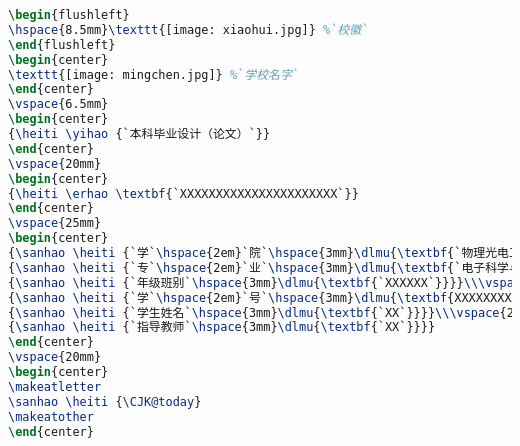 \begin{lstlisting}[language=TeX]
\begin{flushleft}
\hspace{8.5mm}\texttt{[image: xiaohui.jpg]} %`校徽`
\end{flushleft}
\begin{center} 
\texttt{[image: mingchen.jpg]} %`学校名字`
\end{center}
\vspace{6.5mm}
\begin{center}
{\heiti \yihao {`本科毕业设计（论文）`}}
\end{center}
\vspace{20mm}
\begin{center}
{\heiti \erhao \textbf{`XXXXXXXXXXXXXXXXXXXXXX`}}
\end{center}
\vspace{25mm}
\begin{center}
{\sanhao \heiti {`学`\hspace{2em}`院`\hspace{3mm}\dlmu{\textbf{`物理光电工程学院`}}}}\\\vspace{2.5mm}
{\sanhao \heiti {`专`\hspace{2em}`业`\hspace{3mm}\dlmu{\textbf{`电子科学与技术`}}}}\\\vspace{2.5mm}
{\sanhao \heiti {`年级班别`\hspace{3mm}\dlmu{\textbf{`XXXXXX`}}}}\\\vspace{2.5mm}
{\sanhao \heiti {`学`\hspace{2em}`号`\hspace{3mm}\dlmu{\textbf{XXXXXXXX}}}}\\\vspace{2.5mm}
{\sanhao \heiti {`学生姓名`\hspace{3mm}\dlmu{\textbf{`XX`}}}}\\\vspace{2.5mm}
{\sanhao \heiti {`指导教师`\hspace{3mm}\dlmu{\textbf{`XX`}}}}
\end{center}
\vspace{20mm}
\begin{center}
\makeatletter
\sanhao \heiti {\CJK@today}
\makeatother
\end{center}
\end{lstlisting}

